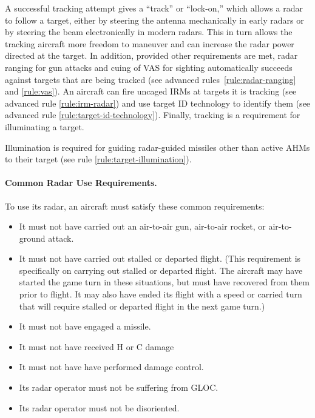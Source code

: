 {A successful tracking attempt gives a “track” or “lock-on,” which allows a radar to follow a target, either by steering the antenna mechanically in early radars or by steering the beam electronically in modern radars. This in turn allows the tracking aircraft more freedom to maneuver and can increase the radar power directed at the target. In addition, provided other requirements are met, radar ranging for gun attacks and cuing of VAS for sighting automatically succeeds against targets that are being tracked (see advanced rules~\ref{rule:radar-ranging} and \ref{rule:vas}). An aircraft can fire uncaged IRMs at targets it is tracking (see advanced rule \ref{rule:irm-radar}) and use target ID technology to identify them (see advanced rule \ref{rule:target-id-technology}). Finally, tracking is a requirement for illuminating a target. 

Illumination is required for guiding radar-guided missiles other than active AHMs to their target (see rule \ref{rule:target-illumination}).

\paragraph{Common Radar Use Requirements.}
\label{rule:common-radar-use-requirements}

To use its radar, an aircraft must satisfy these common requirements:

    \begin{itemize}
        \item It must not have carried out an air-to-air gun, air-to-air rocket, or air-to-ground attack.
        \item It must not have carried out stalled or departed flight. (This requirement is specifically on carrying out stalled or departed flight. The aircraft may have started the game turn in these situations, but must have recovered from them prior to flight. It may also have ended its flight with a speed or carried turn that will require stalled or departed flight in the next game turn.)
        \item It must not have engaged a missile.
        \item It must not have received H or C damage
        \item It must not have have performed damage control.
        \item Its radar operator must not be suffering from GLOC.
        \item Its radar operator must not be disoriented.
    \end{itemize}
    
}

